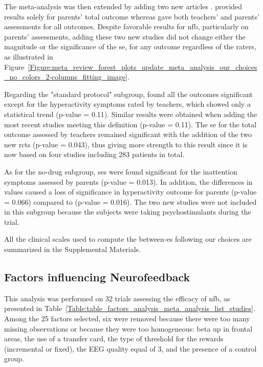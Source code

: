 The meta-analysis was then extended by adding two new articles \citep{Strehl2017, Baumeister2016}. \citet{Baumeister2016} provided results 
solely for parents' total outcome whereas \citet{Strehl2017} gave both teachers' and parents' assessments for all outcomes. 
Despite favorable results for \gls{nfb}, particularly on parents' assessments, adding these two new studies did not 
change either the magnitude or the significance of the \gls{se}, for any outcome regardless of the raters,
as illustrated in Figure~\ref{Figure:meta_review_forest_plots_update_meta_analysis_our_choices_no_colors_2-columns_fitting_image}. 

Regarding the "standard protocol" subgroup, \citet{Cortese2016} found all the outcomes significant except for the 
hyperactivity symptoms rated by teachers, which showed only a statistical trend (p-value = 0.11). Similar results 
were obtained when adding the most recent studies meeting this definition \citep{Strehl2017} (p-value = 0.11). 
The \gls{se} for the total outcome assessed by teachers remained significant with the addition of the two new
\glspl{rct} (p-value = 0.043), thus giving more strength to this result since it is now based on four studies including 283
patients in total.

As for the no-drug subgroup, \glspl{se} were found significant for the inattention symptoms assessed by parents (p-value = 0.013). 
In addition, the differences in \citet{Arnold2014} values caused a loss of significance in hyperactivity outcome for parents 
(p-value = 0.066) compared to \citet{Cortese2016} (p-value = 0.016). The two new studies were not included in this 
subgroup because the subjects were taking psychostimulants during the trial.

All the clinical scales used to compute the between-\gls{es} following our choices are summarized in the Supplemental Materials.

\subsection{Factors influencing Neurofeedback}

This analysis was performed on 32 trials assessing the efficacy of \gls{nfb}, as presented 
in Table~\ref{Table:table_factors_analysis_meta_analysis_list_studies}. Among the 25 factors selected, six were 
removed because there were too many missing observations or because they were too homogeneous: beta up in frontal areas, 
the use of a transfer card, the type of threshold for the rewards (incremental or fixed), the EEG quality equal of 3, and the 
presence of a control group. 

